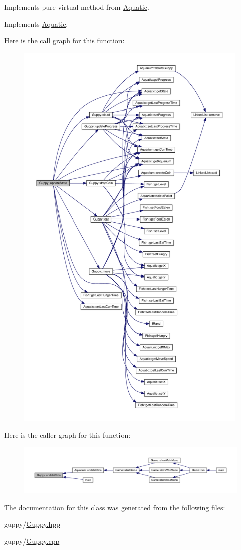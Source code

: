 Implements pure virtual method from \mbox{\hyperlink{class_aquatic}{Aquatic}}. 



Implements \mbox{\hyperlink{class_aquatic_a51e44c95476d72a841fea667c6cbbedc}{Aquatic}}.

Here is the call graph for this function\+:\nopagebreak
\begin{figure}[H]
\begin{center}
\leavevmode
\includegraphics[height=550pt]{class_guppy_ac62ef7053d40430ad98c1d5a54699f9d_cgraph}
\end{center}
\end{figure}
Here is the caller graph for this function\+:
\nopagebreak
\begin{figure}[H]
\begin{center}
\leavevmode
\includegraphics[width=350pt]{class_guppy_ac62ef7053d40430ad98c1d5a54699f9d_icgraph}
\end{center}
\end{figure}


The documentation for this class was generated from the following files\+:\begin{DoxyCompactItemize}
\item 
guppy/\mbox{\hyperlink{_guppy_8hpp}{Guppy.\+hpp}}\item 
guppy/\mbox{\hyperlink{_guppy_8cpp}{Guppy.\+cpp}}\end{DoxyCompactItemize}
